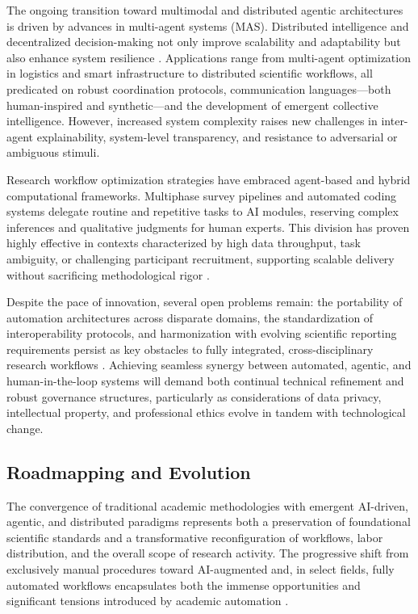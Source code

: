 \documentclass[sigconf]{acmart}
\begin{document}
The ongoing transition toward multimodal and distributed agentic architectures is driven by advances in multi-agent systems (MAS). Distributed intelligence and decentralized decision-making not only improve scalability and adaptability but also enhance system resilience \cite{ref21,ref22,ref25,ref26,ref40,ref49,ref101,ref102,ref111,ref112,ref113,ref114,ref115}. Applications range from multi-agent optimization in logistics and smart infrastructure to distributed scientific workflows, all predicated on robust coordination protocols, communication languages—both human-inspired and synthetic—and the development of emergent collective intelligence. However, increased system complexity raises new challenges in inter-agent explainability, system-level transparency, and resistance to adversarial or ambiguous stimuli.

Research workflow optimization strategies have embraced agent-based and hybrid computational frameworks. Multiphase survey pipelines and automated coding systems delegate routine and repetitive tasks to AI modules, reserving complex inferences and qualitative judgments for human experts. This division has proven highly effective in contexts characterized by high data throughput, task ambiguity, or challenging participant recruitment, supporting scalable delivery without sacrificing methodological rigor \cite{ref51,ref70,ref76,ref80,ref83,ref94,ref96}.

Despite the pace of innovation, several open problems remain: the portability of automation architectures across disparate domains, the standardization of interoperability protocols, and harmonization with evolving scientific reporting requirements persist as key obstacles to fully integrated, cross-disciplinary research workflows \cite{ref28,ref29,ref31,ref78,ref80}. Achieving seamless synergy between automated, agentic, and human-in-the-loop systems will demand both continual technical refinement and robust governance structures, particularly as considerations of data privacy, intellectual property, and professional ethics evolve in tandem with technological change.

\subsection{Roadmapping and Evolution}

The convergence of traditional academic methodologies with emergent AI-driven, agentic, and distributed paradigms represents both a preservation of foundational scientific standards and a transformative reconfiguration of workflows, labor distribution, and the overall scope of research activity. The progressive shift from exclusively manual procedures toward AI-augmented and, in select fields, fully automated workflows encapsulates both the immense opportunities and significant tensions introduced by academic automation \cite{ref25,ref26,ref40,ref52,ref56,ref61,ref64,ref69,ref80}.
\end{document}
